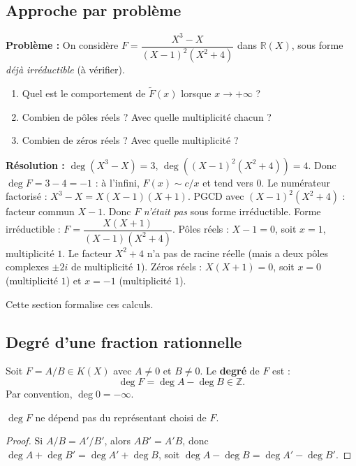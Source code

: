 \subsection{Approche par problème}
\textbf{Problème :} On considère $F = \dfrac{X^3 - X}{(X - 1)^2 (X^2 + 4)}$ dans $\mathbb{R}(X)$, sous forme \emph{déjà irréductible} (à vérifier).
\begin{enumerate}
    \item Quel est le comportement de $\widetilde{F}(x)$ lorsque $x \to +\infty$ ?
    \item Combien de pôles réels ? Avec quelle multiplicité chacun ?
    \item Combien de zéros réels ? Avec quelle multiplicité ?
\end{enumerate}

\textbf{Résolution :}
$\deg(X^3 - X) = 3$, $\deg((X-1)^2 (X^2 + 4)) = 4$. Donc $\deg F = 3 - 4 = -1$ : à l'infini, $F(x) \sim c/x$ et tend vers $0$.
Le numérateur factorisé : $X^3 - X = X(X - 1)(X + 1)$. PGCD avec $(X - 1)^2 (X^2 + 4)$ : facteur commun $X - 1$. Donc $F$ \emph{n'était pas} sous forme irréductible.
Forme irréductible : $F = \dfrac{X(X + 1)}{(X - 1)(X^2 + 4)}$.
Pôles réels : $X - 1 = 0$, soit $x = 1$, multiplicité $1$. Le facteur $X^2 + 4$ n'a pas de racine réelle (mais a deux pôles complexes $\pm 2i$ de multiplicité $1$).
Zéros réels : $X(X + 1) = 0$, soit $x = 0$ (multiplicité $1$) et $x = -1$ (multiplicité $1$).

Cette section formalise ces calculs.

\subsection{Degré d'une fraction rationnelle}

\begin{definition}[Degré]
Soit $F = A/B \in K(X)$ avec $A \neq 0$ et $B \neq 0$. Le \textbf{degré} de $F$ est :
\[ \deg F = \deg A - \deg B \in \mathbb{Z}. \]
Par convention, $\deg 0 = -\infty$.
\end{definition}

\begin{proposition}
$\deg F$ ne dépend pas du représentant choisi de $F$.
\end{proposition}

\begin{proof}
Si $A/B = A'/B'$, alors $A B' = A' B$, donc $\deg A + \deg B' = \deg A' + \deg B$, soit $\deg A - \deg B = \deg A' - \deg B'$.
\end{proof}

